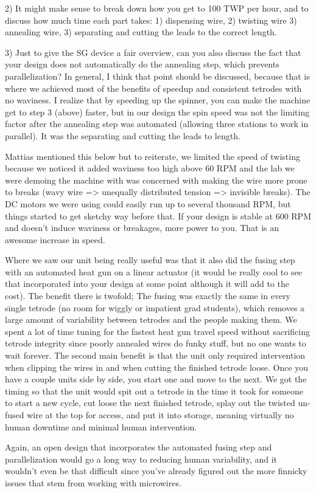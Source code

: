 \documentclass[11pt,a4paper]{article}
\begin{document}
2) It might make sense to break down how you get to 100 TWP per hour, and to
discuss how much time each part takes: 1) dispensing wire, 2) twisting wire 3)
annealing wire, 3) separating and cutting the leads to the correct length.

3) Just to give the SG device a fair overview, can you also discuss the fact
that your design does not automatically do the annealing step, which prevents
parallelization? In general, I think that point should be discussed, because
that is where we achieved most of the benefits of speedup and consistent
tetrodes with no waviness.  I realize that by speeding up the spinner, you can
make the machine get to step 3 (above) faster, but in our design the spin speed
was not the limiting factor after the annealing step was automated (allowing
three stations to work in parallel).  It was the separating and cutting the
leads to length.

Mattias mentioned this below but to reiterate, we limited the speed of twisting
because we noticed it added waviness too high above 60 RPM and the lab we were
demoing the machine with was concerned with making the wire more prone to
breaks (wavy wire => unequally distributed tension => invisible breaks). The DC
motors we were using could easily run up to several thousand RPM, but things
started to get sketchy way before that. If your design is stable at 600 RPM and
doesn't induce waviness or breakages, more power to you. That is an awesome
increase in speed.

Where we saw our unit being really useful was that it also did the fusing step
with an automated heat gun on a linear actuator (it would be really cool to see
that incorporated into your design at some point although it will add to the
cost). The benefit there is twofold; The fusing was exactly the same in every
single tetrode (no room for wiggly or impatient grad students), which removes a
large amount of variability between tetrodes and the people making them. We
spent a lot of time tuning for the fastest heat gun travel speed without
sacrificing tetrode integrity since poorly annealed wires do funky stuff, but
no one wants to wait forever.  The second main benefit is that the unit only
required intervention when clipping the wires in and when cutting the finished
tetrode loose. Once you have a couple units side by side, you start one and
move to the next. We got the timing so that the unit would spit out a tetrode
in the time it took for someone to start a new cycle, cut loose the next
finished tetrode, splay out the twisted un-fused wire at the top for access,
and put it into storage, meaning virtually no human downtime and minimal human
intervention.

Again, an open design that incorporates the automated fusing step and
parallelization would go a long way to reducing human variability, and it
wouldn't even be that difficult since you've already figured out the more
finnicky issues that stem from working with microwires.




\medskip



\end{document}
